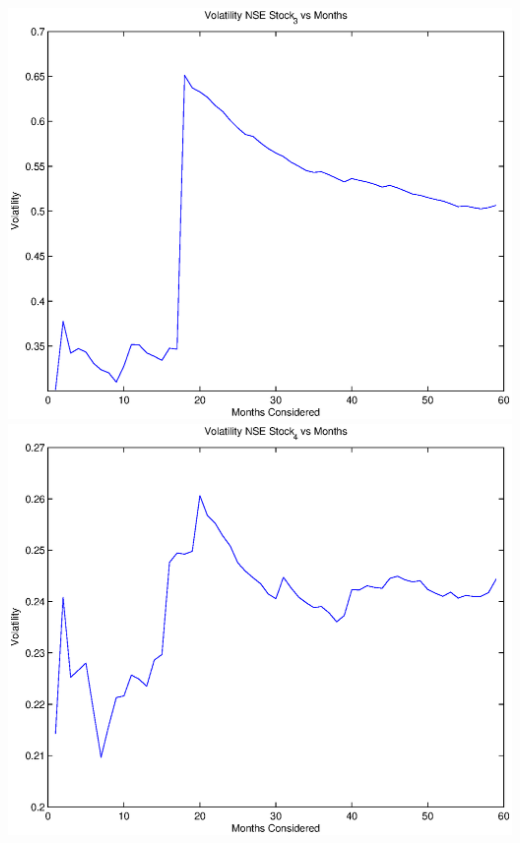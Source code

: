 \documentclass{article}
\begin{document}
\includegraphics[width=\textwidth]{Volatility_NSE_Stock_3_vs_Months} \\

\includegraphics[width=\textwidth]{Volatility_NSE_Stock_4_vs_Months} \\
\end{document}
